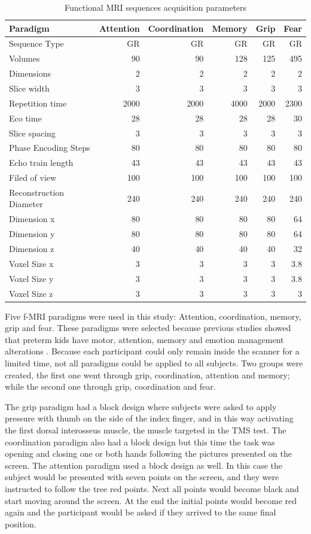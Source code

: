 \begin{table}
	\centering
	\footnotesize
		\begin{tabular}{lrrrrr}
	\toprule
	Paradigm &Attention	&Coordination	&Memory	&Grip &Fear\\ 
	\midrule
	Sequence Type	&GR	&GR	&GR	&GR &GR\\
	Volumes	&90	&90	&128	&125 &495\\
	Dimensions	&2	&2	&2	&2 &2\\
	Slice width	&3	&3	&3	&3 &3\\ \addlinespace
	Repetition time	&2000	&2000	&4000	&2000 &2300\\
	Eco time	&28	&28	&28	&28 &30\\
	Slice spacing	&3	&3	&3	&3 &3\\
	Phase Encoding Steps	&80	&80	&80	&80 &80\\
	Echo train length	&43	&43	&43	&43 &43\\
	Filed of view	&100	&100	&100	&100 &100\\
	Reconstruction	Diameter&240	&240	&240	&240 &240\\ \addlinespace
	Dimension x &80	&80 &80 &80 &64 \\
	Dimension y &80	&80 &80 &80 &64 \\
	Dimension z &40	&40 &40 &40 &32 \\ \addlinespace
	Voxel Size x	&3 &3 &3 &3 &3.8 \\
	Voxel Size y	&3 &3 &3 &3 &3.8 \\
	Voxel Size z	&3 &3 &3 &3 &3 \\
	\bottomrule
		\end{tabular}
	\caption{Functional MRI sequences acquisition parameters}
	\label{tab_fmri_params}
\end{table}

Five f-MRI paradigms were used in this study: Attention, coordination, memory, grip and fear. These paradigms were selected because previous studies  showed that preterm kids have motor, attention, memory and emotion management alterations \autocite{nosarti_neurodevelopmental_2010}. Because each participant could only remain inside the scanner for a limited time, not all paradigms could be applied to all subjects. Two groups were created, the first one went through grip, coordination, attention and memory; while the second one through grip, coordination and fear. 

The grip paradigm had a block design where subjects were asked to apply pressure with thumb on the side of the index finger, and in this way activating the first dorsal interosseus muscle, the muscle targeted in the TMS test. The coordination paradigm also had a block design but this time the task was opening and closing one or both hands following the pictures presented on the screen. The attention paradigm used a block design as well. In this case the subject would be presented with seven points on the screen, and they were instructed to follow the tree red points. Next all points would become black and start moving around the screen. At the end the initial points would become red again and the participant would be asked if they arrived to the same final position. 


